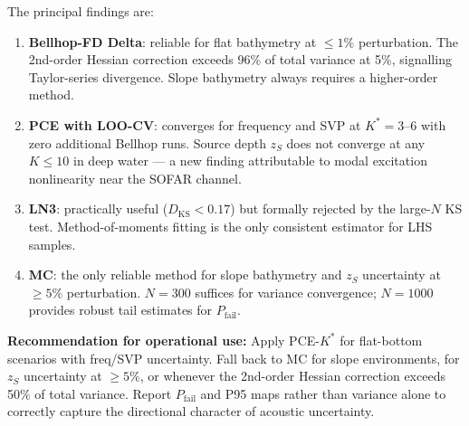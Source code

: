 \documentclass[journal,10pt,twoside]{IEEEtran}
\begin{document}
The principal findings are:
\begin{enumerate}
  \item \textbf{Bellhop-FD Delta}: reliable for flat bathymetry at $\leq1\%$
        perturbation.
        The 2nd-order Hessian correction exceeds 96\% of total variance at 5\%,
        signalling Taylor-series divergence.
        Slope bathymetry always requires a higher-order method.
  \item \textbf{PCE with LOO-CV}: converges for frequency and SVP at
        $K^* = 3$--6 with zero additional Bellhop runs.
        Source depth $z_S$ does not converge at any $K \leq 10$ in deep water ---
        a new finding attributable to modal excitation nonlinearity near the SOFAR channel.
  \item \textbf{LN3}: practically useful ($D_\mathrm{KS} < 0.17$) but formally
        rejected by the large-$N$ KS test.
        Method-of-moments fitting is the only consistent estimator for LHS samples.
  \item \textbf{MC}: the only reliable method for slope bathymetry and $z_S$
        uncertainty at $\geq5\%$ perturbation.
        $N = 300$ suffices for variance convergence; $N = 1000$ provides robust
        tail estimates for $P_\mathrm{fail}$.
\end{enumerate}

\textbf{Recommendation for operational use:}
Apply PCE-$K^*$ for flat-bottom scenarios with freq/SVP uncertainty.
Fall back to MC for slope environments, for $z_S$ uncertainty at $\geq5\%$,
or whenever the 2nd-order Hessian correction exceeds 50\% of total variance.
Report $P_\mathrm{fail}$ and P95 maps rather than variance alone to correctly
capture the directional character of acoustic uncertainty.



\end{document}

